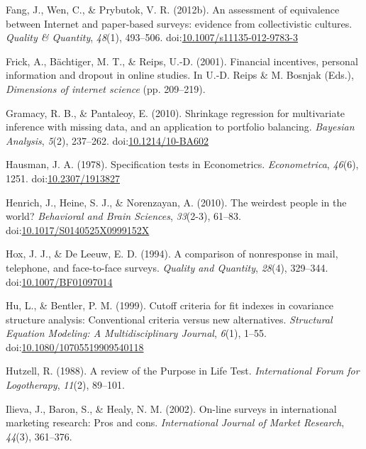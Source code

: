 \documentclass[english,man, mask]{apa6}
\theoremstyle{definition}
\theoremstyle{definition}
\theoremstyle{definition}
\theoremstyle{remark}
\begin{document}
\hypertarget{ref-Fang2012}{}
Fang, J., Wen, C., \& Prybutok, V. R. (2012b). An assessment of
equivalence between Internet and paper-based surveys: evidence from
collectivistic cultures. \emph{Quality \& Quantity}, \emph{48}(1),
493--506.
doi:\href{https://doi.org/10.1007/s11135-012-9783-3}{10.1007/s11135-012-9783-3}

\hypertarget{ref-Frick2001}{}
Frick, A., Bächtiger, M. T., \& Reips, U.-D. (2001). Financial
incentives, personal information and dropout in online studies. In U.-D.
Reips \& M. Bosnjak (Eds.), \emph{Dimensions of internet science} (pp.
209--219).

\hypertarget{ref-Gramacy2010}{}
Gramacy, R. B., \& Pantaleoy, E. (2010). Shrinkage regression for
multivariate inference with missing data, and an application to
portfolio balancing. \emph{Bayesian Analysis}, \emph{5}(2), 237--262.
doi:\href{https://doi.org/10.1214/10-BA602}{10.1214/10-BA602}

\hypertarget{ref-Hausman1978}{}
Hausman, J. A. (1978). Specification tests in Econometrics.
\emph{Econometrica}, \emph{46}(6), 1251.
doi:\href{https://doi.org/10.2307/1913827}{10.2307/1913827}

\hypertarget{ref-Henrich2010}{}
Henrich, J., Heine, S. J., \& Norenzayan, A. (2010). The weirdest people
in the world? \emph{Behavioral and Brain Sciences}, \emph{33}(2-3),
61--83.
doi:\href{https://doi.org/10.1017/S0140525X0999152X}{10.1017/S0140525X0999152X}

\hypertarget{ref-Hox1994}{}
Hox, J. J., \& De Leeuw, E. D. (1994). A comparison of nonresponse in
mail, telephone, and face-to-face surveys. \emph{Quality and Quantity},
\emph{28}(4), 329--344.
doi:\href{https://doi.org/10.1007/BF01097014}{10.1007/BF01097014}

\hypertarget{ref-Hu1999}{}
Hu, L., \& Bentler, P. M. (1999). Cutoff criteria for fit indexes in
covariance structure analysis: Conventional criteria versus new
alternatives. \emph{Structural Equation Modeling: A Multidisciplinary
Journal}, \emph{6}(1), 1--55.
doi:\href{https://doi.org/10.1080/10705519909540118}{10.1080/10705519909540118}

\hypertarget{ref-Hutzell1988}{}
Hutzell, R. (1988). A review of the Purpose in Life Test.
\emph{International Forum for Logotherapy}, \emph{11}(2), 89--101.

\hypertarget{ref-Ilieva2001}{}
Ilieva, J., Baron, S., \& Healy, N. M. (2002). On-line surveys in
international marketing research: Pros and cons. \emph{International
Journal of Market Research}, \emph{44}(3), 361--376.
\end{document}
